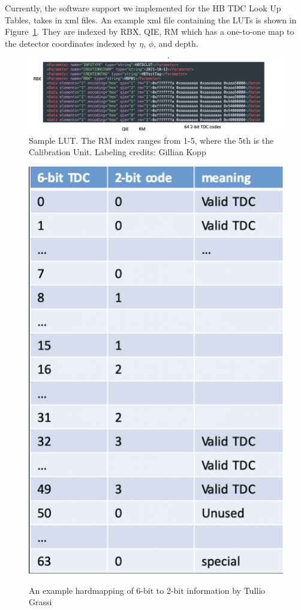 Currently, the software support we implemented for the HB TDC Look Up Tables, takes in xml files. An example xml file containing the LUTs is shown in  Figure~\ref{fig:XMLFile}. They are indexed by RBX, QIE, RM which has a one-to-one map to the detector coordinates indexed by $\eta$, $\phi$, and depth. 

\begin{figure}[htbp!]
\caption{Sample LUT. The RM index ranges from 1-5, where the 5th is the Calibration Unit. Labeling credits: Gillian Kopp}
\begin{center}
\includegraphics[scale=0.6]{fig/ExampleLUT.png}
\end{center}
\label{fig:XMLFile}
\end{figure}

\begin{figure}[htbp!]
\caption{An example hardmapping of 6-bit to 2-bit information by Tullio Grassi}
\centering
\includegraphics[scale=0.6]{fig/6bitTo2bitMap.png}
\label{fig:bitMapping}
\end{figure}

